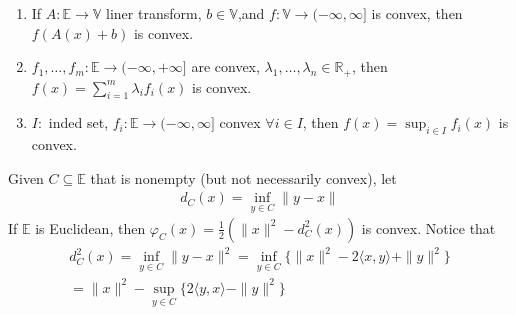 \documentclass[11pt]{article}
\begin{document}
\begin{theorem}
    \begin{enumerate}
        \item If $A: \mathbb{E} \to \mathbb{V}$ liner transform, $b \in \mathbb{V}$,and $f: \mathbb{V} \to { (-\infty,\infty]}$ is convex, then $f(A(x)+b)$ is convex.
        \item $f_1, \ldots ,f_{m}: \mathbb{E} \to (-\infty,+ \infty]$ are convex, $\lambda_1, \ldots ,
        \lambda_n \in \mathbb{R}_{+}$, then $f(x) = \sum_{i=1}^{m} \lambda_i f_i(x)$ is convex.
        \item $I:$ inded set, $f_i: \mathbb{E} \to (-\infty,\infty]$ convex $\forall i \in I$,
        then $f(x) = \sup_{i \in I}f_i(x)$ is convex.
    \end{enumerate}
\end{theorem}

\begin{example}
    Given $C \subseteq  \mathbb{E}$ that is nonempty (but not necessarily convex), let
    \begin{align*}
        d_{C}(x) = \inf_{y \in C}\| y-x \| 
    \end{align*}
    If $\mathbb{E}$ is Euclidean, then $\varphi_{C}(x) = \frac{1}{2}(\| x \|^{2} - 
    d_{C}^{2}(x) )$ is convex.
    Notice that 
    \begin{align*}
        d_{C}^{2}(x) = \inf_{y \in C}\| y-x \|^{2} = \inf_{y \in C} \{ \| x \|^{2} - 2
        \langle x,y \rangle +\| y \|^{2}  \}\\
        = \| x \| ^{2} -\sup_{y \in C} \{ 2\langle y,x \rangle -\| y \|^{2} \}
    \end{align*}
\end{example}
\end{document}

